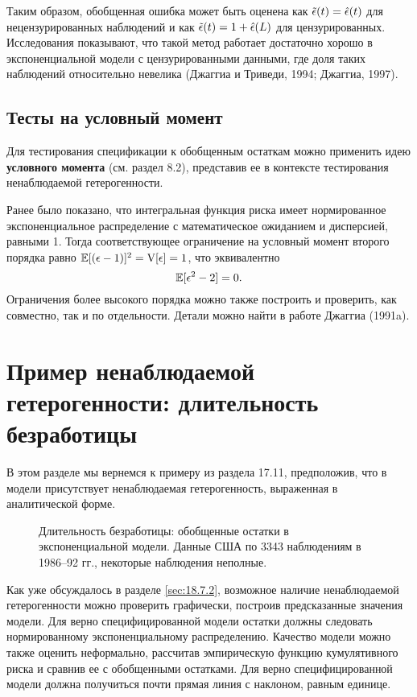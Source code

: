 Таким образом, обобщенная ошибка может быть оценена как $\tilde{\epsilon}(t) = \hat{\epsilon}(t)$ для нецензурированных наблюдений и как $\tilde{\epsilon}(t) = 1 + \hat{\epsilon}(L)$ для цензурированных. Исследования показывают, что такой метод работает достаточно хорошо в экспоненциальной модели с цензурированными данными, где доля таких наблюдений относительно невелика (Джаггиа и Триведи, 1994; Джаггиа, 1997).

\subsection{Тесты на условный момент}\label{sec:18.7.3} %
\noindent

Для тестирования спецификации к обобщенным остаткам можно применить идею \textbf{условного момента} (см. раздел 8.2), %
представив ее в контексте тестирования ненаблюдаемой гетерогенности.

Ранее было показано, что интегральная функция риска имеет нормированное экспоненциальное распределение с математическое ожиданием и дисперсией, равными 1. Тогда соответствующее ограничение на условный момент второго порядка равно $\mathbb{E}[(\epsilon - 1)]^2 = \mathrm{V}[\epsilon] = 1$, что эквивалентно
    $$\mathbb{E}[\epsilon^2 - 2] = 0.$$
Ограничения более высокого порядка можно также построить и проверить, как совместно, так и по отдельности. Детали можно найти в работе Джаггиа (1991a).




\section{Пример ненаблюдаемой гетерогенности: длительность безработицы}\label{sec:18.8}

\noindent
В этом разделе мы вернемся к примеру из раздела 17.11, %
предположив, что в модели присутствует ненаблюдаемая гетерогенность, выраженная в аналитической форме.

\begin{figure}[ht!]\caption{Длительность безработицы: обобщенные остатки в экспоненциальной модели. Данные США по 3343 наблюдениям в 1986--92 гг., некоторые наблюдения неполные.}\label{fig:18.2}
\centering
\end{figure}

Как уже обсуждалось в разделе \ref{sec:18.7.2}, возможное наличие ненаблюдаемой гетерогенности можно проверить графически, построив предсказанные значения модели. Для верно специфицированной модели остатки должны следовать нормированному экспоненциальному распределению. Качество модели можно также оценить неформально, рассчитав эмпирическую функцию кумулятивного риска и сравнив ее с обобщенными остатками. Для верно специфицированной модели должна получиться почти прямая линия с наклоном, равным единице.

